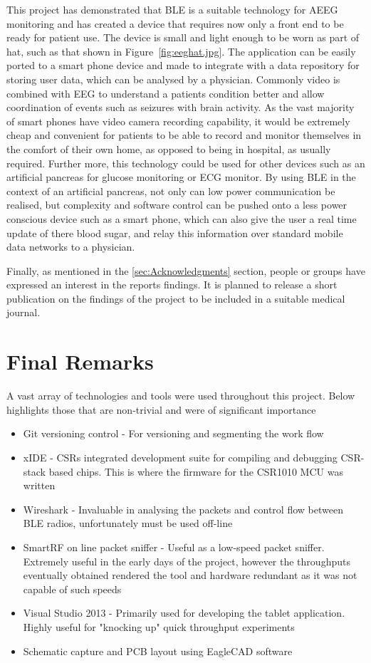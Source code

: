 \documentclass[]{article}
\begin{document}
This project has demonstrated that \ac{BLE} is a suitable technology for \ac{AEEG} monitoring and has created a device that requires now only a front end to be ready for patient use. The device is small and light enough to be worn as part of hat, such as that shown in Figure~\ref{fig:eeghat.jpg}. The application can be easily ported to a smart phone device and made to integrate with a data repository for storing user data, which can be analysed by a physician. Commonly video is combined with \ac{EEG} to understand a patients condition better and allow coordination of events such as seizures with brain activity. As the vast majority of smart phones have video camera recording capability, it would be extremely cheap and convenient for patients to be able to record and monitor themselves in the comfort of their own home, as opposed to being in hospital, as usually required. Further more, this technology could be used for other devices such as an artificial pancreas for glucose monitoring or \ac{ECG} monitor. By using \ac{BLE} in the context of an artificial pancreas, not only can low power communication be realised, but complexity and software control can be pushed onto a less power conscious device such as a smart phone, which can also give the user a real time update of there blood sugar, and relay this information over standard mobile data networks to a physician. 

Finally, as mentioned in the \ref{sec:Acknowledgments} section, people or groups have expressed an interest in the reports findings. It is planned to release a short publication on the findings of the project to be included in a suitable medical journal. 


\clearpage
\section{Final Remarks}
A vast array of technologies and tools were used throughout this project. Below highlights those that are non-trivial and were of significant importance

\begin{itemize}
	\item Git versioning control - For versioning and segmenting the work flow
	\item xIDE - CSRs integrated development suite for compiling and debugging CSR-stack based chips. This is where the firmware for the CSR1010 MCU was written
	\item Wireshark - Invaluable in analysing the packets and control flow between BLE radios, unfortunately must be used off-line
	\item SmartRF on line packet sniffer - Useful as a low-speed packet sniffer. Extremely useful in the early days of the project, however the throughputs eventually obtained rendered the tool and hardware redundant as it was not capable of such speeds
	\item Visual Studio 2013 - Primarily used for developing the tablet application. Highly useful for "knocking up" quick throughput experiments 
	\item Schematic capture and \ac{PCB} layout using EagleCAD software
\end{itemize}
\end{document}
